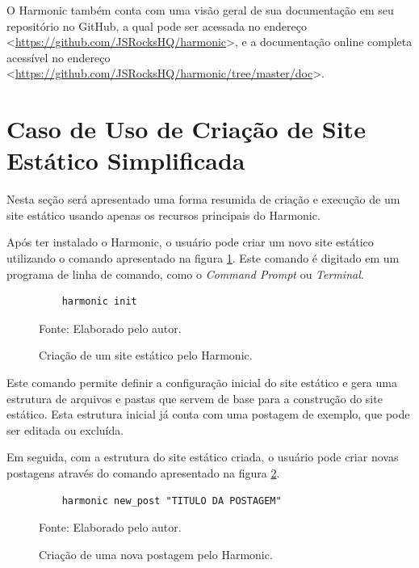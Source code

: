 \documentclass[ppginf, pep]{esinucpel}
\begin{document}
O Harmonic também conta com uma visão geral de sua documentação em seu repositório no GitHub, a qual pode ser acessada no endereço <\url{https://github.com/JSRocksHQ/harmonic}>, e a documentação online completa acessível no endereço <\url{https://github.com/JSRocksHQ/harmonic/tree/master/doc}>.

\section{Caso de Uso de Criação de Site Estático Simplificada}

Nesta seção será apresentado uma forma resumida de criação e execução de um site estático usando apenas os recursos principais do Harmonic.

Após ter instalado o Harmonic, o usuário pode criar um novo site estático utilizando o comando apresentado na figura \ref{fig:comando_harmonic_init}. Este comando é digitado em um programa de linha de comando, como o \textit{Command Prompt} ou \textit{Terminal}.

\begin{figure}[H]
    \centering
    \caption{Criação de um site estático pelo Harmonic.}
    \vspace{5pt}
    \lstset{language=sh}
    \begin{lstlisting}
    harmonic init
    \end{lstlisting}
    Fonte: Elaborado pelo autor.
    \label{fig:comando_harmonic_init}
\end{figure}

Este comando permite definir a configuração inicial do site estático e gera uma estrutura de arquivos e pastas que servem de base para a construção do site estático. Esta estrutura inicial já conta com uma postagem de exemplo, que pode ser editada ou excluída.

Em seguida, com a estrutura do site estático criada, o usuário pode criar novas postagens através do comando apresentado na figura \ref{fig:comando_harmonic_new_post}.

\begin{figure}[H]
    \centering
    \caption{Criação de uma nova postagem pelo Harmonic.}
    \vspace{5pt}
    \lstset{language=sh}
    \begin{lstlisting}
    harmonic new_post "TITULO DA POSTAGEM"
    \end{lstlisting}
    Fonte: Elaborado pelo autor.
    \label{fig:comando_harmonic_new_post}
\end{figure}
\end{document}
